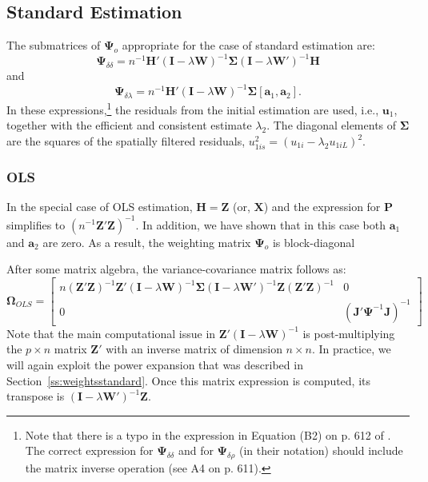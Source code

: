 \documentclass{article}
\begin{document}
\subsection{Standard Estimation}\label{ss:asyvarstandard}
The submatrices of $\mathbf{\Psi}_o$ appropriate for the case of standard estimation
are:
\begin{equation}\label{eq:psidd_standard}
\mathbf{\Psi}_{\delta \delta} = n^{-1} \mathbf{H'} (\mathbf{I} - \lambda \mathbf{W} )^{-1} \mathbf{\Sigma}
 (\mathbf{I} - \lambda \mathbf{W'} )^{-1} \mathbf{H}
\end{equation}
and
\begin{equation}\label{eq:psidl_standard}
\mathbf{\Psi}_{\delta \lambda} = n^{-1} \mathbf{H'} (\mathbf{I} - \lambda \mathbf{W} )^{-1} \mathbf{\Sigma} [ \mathbf{a}_1, \mathbf{a}_2 ].
\end{equation}
In these expressions,\footnote{Note that there is a typo in the expression in Equation (B2)
on p. 612 of \cite{Arraizetal:10}. The correct expression for $\mathbf{\Psi}_{\delta \delta}$
and for $\mathbf{\Psi}_{\delta \rho}$ (in their notation) should include the matrix inverse
operation (see A4 on p. 611).}  the residuals from the initial estimation are used, i.e., $\mathbf{u}_1$,
together with the efficient and consistent estimate $\lambda_2$. The diagonal elements
of $\mathbf{\Sigma}$ are the squares of the spatially filtered residuals, $ u_{1is}^2 = (u_{1i} - \lambda_2 u_{1iL} )^{2}$.

\subsubsection{OLS}
In the special case of OLS estimation, $\mathbf{H} = \mathbf{Z}$ (or, $\mathbf{X}$) and the expression
for $\mathbf{P}$ simplifies to $(n^{-1} \mathbf{Z'Z} )^{-1}$. In addition, we have shown that
in this case both $\mathbf{a}_1$ and $\mathbf{a}_2$ are zero. As a result, the weighting
matrix $\mathbf{\Psi}_o$ is block-diagonal

After some matrix algebra, the variance-covariance matrix follows as:
\begin{equation*}
\mathbf{\Omega}_{OLS} =
\left[
\begin{matrix}
n (\mathbf{Z'Z} )^{-1} \mathbf{Z'} ( \mathbf{I} - \lambda \mathbf{W} )^{-1} \mathbf{\Sigma}
 ( \mathbf{I} - \lambda \mathbf{W'} )^{-1} \mathbf{Z} (\mathbf{Z'Z} )^{-1} & 0\\
 0 & ( \mathbf{J'} \mathbf{\Psi}^{-1} \mathbf{J} )^{-1}
 \end{matrix}
\right]
\end{equation*}
Note that the main computational issue in $ \mathbf{Z'} ( \mathbf{I} - \lambda \mathbf{W} )^{-1} $
is post-multiplying the $p \times n$ matrix $\mathbf{Z'}$ with an inverse matrix of dimension
$n \times n$. In practice, we will again exploit the power expansion that was
described in Section~\ref {ss:weightsstandard}.  Once this matrix expression is 
computed, its transpose is  $( \mathbf{I} - \lambda \mathbf{W'} )^{-1} \mathbf{Z}$.
\end{document}
